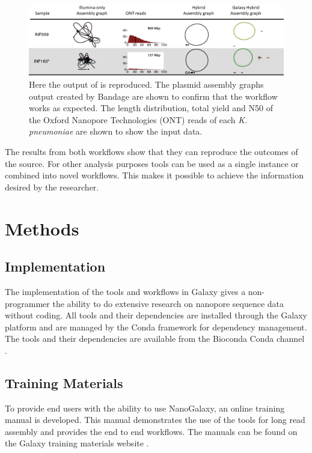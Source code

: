 \documentclass[a4paper,num-refs]{oup-contemporary}
\begin{document}
\begin{figure}[bt!]
\centering
\includegraphics[width=\linewidth]{images/unicycler_result.png}
	\caption{Here the output of \citet{Wick2017} is reproduced. The plasmid assembly graphs output created by Bandage are shown to confirm that the workflow works as expected. The length distribution, total yield and N50 of the Oxford Nanopore Technologies (ONT) reads of each \textit{K. pneumoniae} are shown to show the input data.}\label{figure:WickEtAl}
\end{figure}

The results from both workflows show that they can reproduce the outcomes of the source. For other analysis purposes tools can be used as a single instance or combined into novel workflows. This makes it possible to achieve the information desired by the researcher.

\section{Methods}
\subsection{Implementation}
The implementation of the tools and workflows in Galaxy gives a non-programmer the ability to do extensive research on nanopore sequence data without coding. All tools and their dependencies are installed through the Galaxy platform and are managed by the Conda framework for dependency management. The tools and their dependencies are available from the Bioconda Conda channel \cite{Gruning2018}.

\subsection{Training Materials}
To provide end users with the ability to use NanoGalaxy, an online training manual is developed. This manual demonstrates the use of the tools for long read assembly and provides the end to end workflows. The manuals can be found on the Galaxy training materials website \cite{Batut2018}.  
\end{document}
